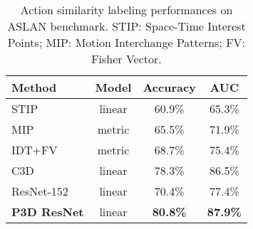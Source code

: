 \documentclass[10pt,twocolumn,letterpaper]{article}
\begin{document}
\begin{table}
\centering
\small
\caption{\small Action similarity labeling performances on ASLAN benchmark. STIP: Space-Time Interest Points; MIP: Motion Interchange Patterns; FV: Fisher Vector.}
\begin{tabular}{l|c|c|c} \hline
\textbf{Method}                                             & \textbf{Model} & \textbf{Accuracy} & \textbf{AUC} \\ \hline
STIP \cite{KG:PAMI12}                                & linear         & 60.9\%        & 65.3\% \\
MIP \cite{kliper2012motion}                                 & metric         & 65.5\%        & 71.9\% \\
IDT+FV \cite{peng2014large}                                 & metric         & 68.7\%        & 75.4\% \\
C3D \cite{tran2015learning}                                 & linear         & 78.3\%        & 86.5\% \\
ResNet-152 \cite{he2015deep}                                 & linear         & 70.4\%        & 77.4\% \\ \hline
\textbf{P3D ResNet}                                      & linear         & \textbf{80.8\%}        & \textbf{87.9\%} \\
\hline
\end{tabular}
\label{tab:aslan}
\vspace{-0.22in}
\end{table}
\end{document}
